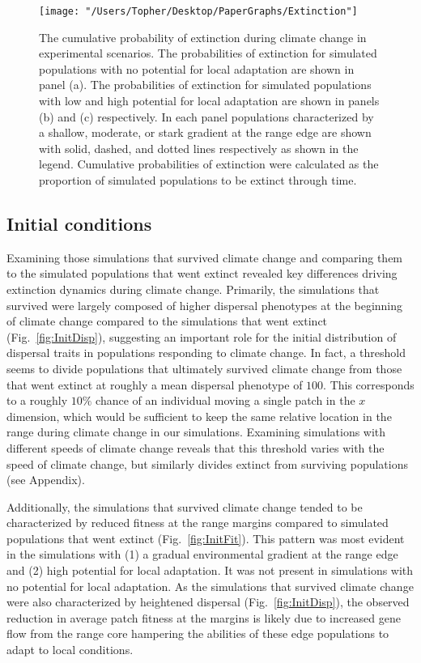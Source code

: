 \documentclass[11pt, oneside]{article}
\begin{document}
\begin{figure}
\centering
\texttt{[image: "/Users/Topher/Desktop/PaperGraphs/Extinction"]}
\vspace{-5mm}
\caption[LoF entry]{The cumulative probability of extinction during climate change in experimental scenarios. The probabilities of extinction for simulated populations with no potential for local adaptation are shown in panel (a). The probabilities of extinction for simulated populations with low and high potential for local adaptation are shown in panels (b) and (c) respectively. In each panel populations characterized by a shallow, moderate, or stark gradient at the range edge are shown with solid, dashed, and dotted lines respectively as shown in the legend. Cumulative probabilities of extinction were calculated as the proportion of simulated populations to be extinct through time.}
\label{fig:ExtProb}
\end{figure}

\subsection{Initial conditions}
Examining those simulations that survived climate change and comparing them to the simulated populations that went extinct revealed key differences driving extinction dynamics during climate change. Primarily, the simulations that survived were largely composed of higher dispersal phenotypes at the beginning of climate change compared to the simulations that went extinct (Fig.~\ref{fig:InitDisp}), suggesting an important role for the initial distribution of dispersal traits in populations responding to climate change. In fact, a threshold seems to divide populations that ultimately survived climate change from those that went extinct at roughly a mean dispersal phenotype of $100$. This corresponds to a roughly $10\%$ chance of an individual moving a single patch in the $x$ dimension, which would be sufficient to keep the same relative location in the range during climate change in our simulations. Examining simulations with different speeds of climate change reveals that this threshold varies with the speed of climate change, but similarly divides extinct from surviving populations (see Appendix).

Additionally, the simulations that survived climate change tended to be characterized by reduced fitness at the range margins compared to simulated populations that went extinct (Fig.~\ref{fig:InitFit}). This pattern was most evident in the simulations with (1) a gradual environmental gradient at the range edge and (2) high potential for local adaptation. It was not present in simulations with no potential for local adaptation. As the simulations that survived climate change were also characterized by heightened dispersal (Fig.~\ref{fig:InitDisp}), the observed reduction in average patch fitness at the margins is likely due to increased gene flow from the range core hampering the abilities of these edge populations to adapt to local conditions. 
\end{document}
